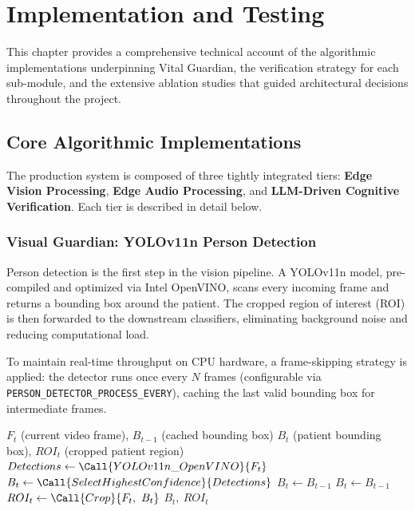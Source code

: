 \chapter{Implementation and Testing}
\label{chap:implementation}

This chapter provides a comprehensive technical account of the algorithmic implementations
underpinning Vital Guardian, the verification strategy for each sub-module, and the
extensive ablation studies that guided architectural decisions throughout the project.

\section{Core Algorithmic Implementations}
\label{sec:algorithms}

The production system is composed of three tightly integrated tiers:
\textbf{Edge Vision Processing}, \textbf{Edge Audio Processing}, and
\textbf{LLM-Driven Cognitive Verification}. Each tier is described in detail below.

\subsection{Visual Guardian: YOLOv11n Person Detection}
\label{subsec:yolo}

Person detection is the first step in the vision pipeline. A YOLOv11n model,
pre-compiled and optimized via Intel OpenVINO, scans every incoming frame and
returns a bounding box around the patient. The cropped region of interest (ROI)
is then forwarded to the downstream classifiers, eliminating background noise and
reducing computational load.

To maintain real-time throughput on CPU hardware, a frame-skipping strategy is
applied: the detector runs once every $N$ frames (configurable via
\texttt{PERSON\_DETECTOR\_PROCESS\_EVERY}), caching the last valid bounding box
for intermediate frames.

\begin{algorithm}[H]
\caption{YOLOv11n-OpenVINO Person Detection and ROI Extraction}
\label{alg:yolo}
\begin{algorithmic}[1]
\Require $F_t$ (current video frame), $B_{t-1}$ (cached bounding box)
\Ensure $B_t$ (patient bounding box), $ROI_t$ (cropped patient region)
    \State $Detections \gets \Call{YOLOv11n\_OpenVINO}{F_t}$
        \State $B_t \gets \Call{SelectHighestConfidence}{Detections}$
    \Else
        \State $B_t \gets B_{t-1}$ 
    \EndIf
\Else
    \State $B_t \gets B_{t-1}$
\EndIf
\State $ROI_t \gets \Call{Crop}{F_t,\ B_t}$
\State \Return $B_t,\ ROI_t$
\end{algorithmic}
\end{algorithm}

